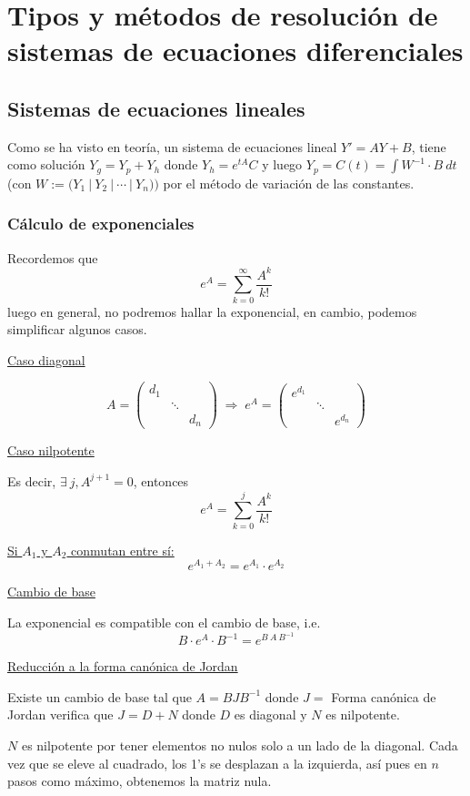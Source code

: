 
\chapter{Tipos y métodos de resolución de sistemas de ecuaciones diferenciales}
\section{Sistemas de ecuaciones lineales}
Como se ha visto en teoría, un sistema de ecuaciones lineal $Y'=AY+B$, tiene como solución $Y_g=Y_p+Y_h$ donde $Y_h=e^{tA}C$ y luego $Y_p=C(t)=\int W^{-1}\cdot B \: dt$ (con $W:=\Big( Y_1 \:  | \:  Y_2 \: | \: \cdots \: | \:  Y_n \Big) )$ por el método de variación de las constantes.

\subsection{Cálculo de exponenciales}
Recordemos que 
$$e^A=\sum_{k=0}^{\infty} \dfrac{A^k}{k!}$$
luego en general, no podremos hallar la exponencial, en cambio, podemos simplificar algunos casos.

\underline{Caso diagonal}

$$A=\begin{pmatrix}
    d_1 \\
    & \ddots \\
    &&d_n
\end{pmatrix} \; \Rightarrow \; e^A=\begin{pmatrix}
    e^{d_1} \\
    & \ddots \\
    &&e^{d_n}
\end{pmatrix}$$

\underline{Caso nilpotente}

Es decir, $ \exists \: j , A^{j+1}=0$, entonces
$$e^A=\sum_{k=0}^j \dfrac{A^k}{k!}$$

\underline{Si $A_1$ y $A_2$ conmutan entre sí:}
$$e^{A_1+A_2}=e^{A_1}\cdot e^{A_2}$$

\underline{Cambio de base}

La exponencial es compatible con el cambio de base, i.e.
$$B \cdot e^A \cdot B^{-1}=e^{B \: A \: B^{-1}}$$

\underline{Reducción a la forma canónica de Jordan}

Existe un cambio de base tal que $A=BJB^{-1}$ donde $J=$ Forma canónica de Jordan verifica que $J=D+N$ donde $D$ es diagonal y $N$ es nilpotente. 

$N$ es nilpotente por tener elementos no nulos solo a un lado de la diagonal. Cada vez que se eleve al cuadrado, los 1's se desplazan a la izquierda, así pues en $n$ pasos como máximo, obtenemos la matriz nula.

